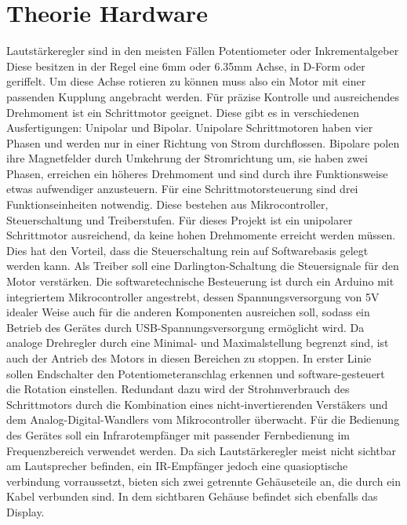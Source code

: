 \documentclass[11pt, titlepage, fleqn]{report}
\begin{document}
		\section{Theorie Hardware}
		\label{sec:Theorie Hardware}
			\sloppy \nohyphens{
			Lautstärkeregler sind in den meisten Fällen Potentiometer oder Inkrementalgeber%
			Diese besitzen in der Regel eine 6mm oder 6.35mm Achse, in D-Form oder geriffelt.
			Um diese Achse rotieren zu können muss also ein Motor mit einer passenden Kupplung angebracht werden. Für präzise Kontrolle und ausreichendes Drehmoment 
			ist ein Schrittmotor geeignet. Diese gibt es in verschiedenen Ausfertigungen: Unipolar und Bipolar. 
			Unipolare Schrittmotoren haben vier Phasen und werden nur in einer Richtung von Strom durchflossen. Bipolare polen ihre Magnetfelder durch 
			Umkehrung der Stromrichtung um, sie haben zwei Phasen, erreichen ein höheres Drehmoment und sind durch ihre Funktionsweise etwas aufwendiger anzusteuern. 
			Für eine Schrittmotorsteuerung sind drei Funktionseinheiten notwendig. Diese bestehen aus Mikrocontroller, Steuerschaltung und Treiberstufen.
			Für dieses Projekt ist ein unipolarer Schrittmotor ausreichend, da keine hohen Drehmomente erreicht werden müssen. Dies hat den Vorteil, dass 
			die Steuerschaltung rein auf Softwarebasis gelegt werden kann. Als Treiber soll eine Darlington-Schaltung die Steuersignale für den Motor verstärken. 
			Die softwaretechnische Besteuerung ist durch ein Arduino mit integriertem Mikrocontroller angestrebt, dessen Spannungsversorgung von 5V 
			idealer Weise auch für die anderen Komponenten ausreichen soll, sodass ein Betrieb des Gerätes durch USB-Spannungsversorgung ermöglicht wird. 
			Da analoge Drehregler durch eine Minimal- und Maximalstellung begrenzt sind, ist auch der Antrieb des Motors in diesen Bereichen zu stoppen. 
			In erster Linie sollen Endschalter den Potentiometeranschlag erkennen und software-gesteuert die Rotation einstellen. Redundant dazu wird der Strohmverbrauch 
			des Schrittmotors durch die Kombination eines nicht-invertierenden Verstäkers und dem Analog-Digital-Wandlers vom Mikrocontroller überwacht. 
			Für die Bedienung des Gerätes soll ein Infrarotempfänger mit passender Fernbedienung im Frequenzbereich verwendet werden. Da sich Lautstärkeregler 
			meist nicht sichtbar am Lautsprecher befinden, ein IR-Empfänger jedoch eine quasioptische verbindung vorraussetzt, bieten sich zwei getrennte 
			Gehäuseteile an, die durch ein Kabel verbunden sind. In dem sichtbaren Gehäuse befindet sich ebenfalls das Display.}
		\newpage
\end{document}
